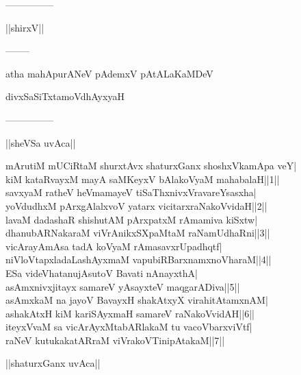 \documentclass{article}
\begin{document}
\begin{center}
---------------
\end{center}

\begin{center}
||shirxV||
\end{center}

\begin{center}
--------
\end{center}

\begin{center}
atha mahApurANeV pAdemxV pAtALaKaMDeV
\end{center}

\begin{center}
divxSaSiTxtamoVdhAyxyaH
\end{center}

\begin{center}
---------------
\end{center}

\begin{center}
||sheVSa uvAca||
\end{center}

mArutiM mUCiRtaM shurxtAvx shaturxGanx shoshxVkamApa veY|\\
kiM kataRvayxM mayA saMKeyxV bAlakoVyaM mahabalaH||1||\\
savxyaM ratheV heVmamayeV tiSaThxnivxVravareYsasxha|\\
yoVdudhxM pArxgAlalxvoV yatarx vicitarxraNakoVvidaH||2||\\
lavaM dadashaR shishutAM pArxpatxM rAmamiva kiSxtw|\\
dhanubARNakaraM viVrAnikxSXpaMtaM raNamUdhaRni||3||\\
vicArayAmAsa tadA koVyaM rAmasavxrUpadhqtf|\\
niVloVtapxladaLashAyxmaM vapubiRBarxnamxnoVharaM||4||\\
ESa videVhatanujAsutoV Bavati nAnayxthA|\\
asAmxnivxjitayx samareV yAsayxteV maqgarADiva||5||\\
asAmxkaM na jayoV BavayxH shakAtxyX virahitAtamxnAM|\\
ashakAtxH kiM kariSAyxmaH samareV raNakoVvidAH||6||\\
iteyxVvaM sa vicArAyxMtabARlakaM tu vacoVbarxviVtf|\\
raNeV kutukakatARraM viVrakoVTinipAtakaM||7||\\

\begin{center}
||shaturxGanx uvAca||
\end{center}
\end{document}
